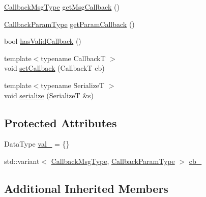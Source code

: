 \begin{DoxyCompactItemize}
\item 
\hyperlink{structvt_1_1collective_1_1reduce_1_1operators_1_1_reduce_data_msg_aa65f18bb2f7493d54e4b776787b7405c}{Callback\+Msg\+Type} \hyperlink{structvt_1_1collective_1_1reduce_1_1operators_1_1_reduce_data_msg_a93ce9897781f19da3572a156008e0959}{get\+Msg\+Callback} ()
\item 
\hyperlink{structvt_1_1collective_1_1reduce_1_1operators_1_1_reduce_data_msg_a4a0c225ffa4221beb2bfba11ac33e5b6}{Callback\+Param\+Type} \hyperlink{structvt_1_1collective_1_1reduce_1_1operators_1_1_reduce_data_msg_a7b4df9fe6e9666ba90352651518824e1}{get\+Param\+Callback} ()
\item 
bool \hyperlink{structvt_1_1collective_1_1reduce_1_1operators_1_1_reduce_data_msg_af1f10174ff62b71ed3c77751a470cd14}{has\+Valid\+Callback} ()
\item 
{\footnotesize template$<$typename CallbackT $>$ }\\void \hyperlink{structvt_1_1collective_1_1reduce_1_1operators_1_1_reduce_data_msg_ab4535ffcdcced24fa100d86449367c57}{set\+Callback} (CallbackT cb)
\item 
{\footnotesize template$<$typename SerializeT $>$ }\\void \hyperlink{structvt_1_1collective_1_1reduce_1_1operators_1_1_reduce_data_msg_a78111e98f011e95f293e5e763a300c51}{serialize} (SerializeT \&s)
\end{DoxyCompactItemize}
\subsection*{Protected Attributes}
\begin{DoxyCompactItemize}
\item 
Data\+Type \hyperlink{structvt_1_1collective_1_1reduce_1_1operators_1_1_reduce_data_msg_a3d393a0bf3245aeac348b66be4e566f9}{val\+\_\+} = \{\}
\item 
std\+::variant$<$ \hyperlink{structvt_1_1collective_1_1reduce_1_1operators_1_1_reduce_data_msg_aa65f18bb2f7493d54e4b776787b7405c}{Callback\+Msg\+Type}, \hyperlink{structvt_1_1collective_1_1reduce_1_1operators_1_1_reduce_data_msg_a4a0c225ffa4221beb2bfba11ac33e5b6}{Callback\+Param\+Type} $>$ \hyperlink{structvt_1_1collective_1_1reduce_1_1operators_1_1_reduce_data_msg_a2d550717b61c35d3ed89a657707cbe14}{cb\+\_\+}
\end{DoxyCompactItemize}
\subsection*{Additional Inherited Members}


